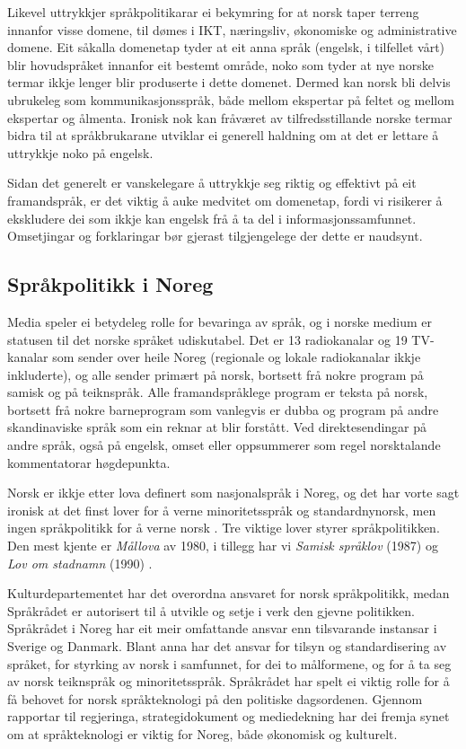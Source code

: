 \begin{multicols}{2}
Likevel uttrykkjer språkpolitikarar ei bekymring \cite{nih:2005} for at norsk taper terreng innanfor visse domene, til dømes i IKT, næringsliv, økonomiske og administrative domene. 
Eit såkalla domenetap tyder at eit anna språk (engelsk, i tilfellet vårt) blir hovudspråket innanfor eit bestemt område, noko som tyder at nye norske termar ikkje lenger blir produserte i dette domenet. 
Dermed kan norsk bli delvis ubrukeleg som kommunikasjonsspråk, både mellom ekspertar på feltet og mellom ekspertar og ålmenta. Ironisk nok kan fråværet av tilfredsstillande norske termar bidra til at språkbrukarane utviklar ei generell haldning om at det er lettare å uttrykkje noko på engelsk. 

Sidan det generelt er vanskelegare å uttrykkje seg riktig og effektivt på eit framandspråk, er det viktig å auke medvitet om domenetap, fordi vi risikerer å ekskludere dei som ikkje kan engelsk frå å ta del i informasjonssamfunnet. 
Omsetjingar og forklaringar bør gjerast tilgjengelege der dette er naudsynt.

\subsection{Språkpolitikk i Noreg}

Media speler ei betydeleg rolle for bevaringa av språk, og i norske medium er statusen til det norske språket udiskutabel. Det er 13 radiokanalar og 19 TV-kanalar som sender over heile Noreg (regionale og lokale radiokanalar ikkje inkluderte), og alle sender primært på norsk, bortsett frå nokre program på samisk og på teiknspråk. 
Alle framandspråklege program er teksta på norsk, bortsett frå nokre barneprogram som vanlegvis er dubba og program på andre skandinaviske språk som ein reknar at blir forstått. 
Ved direktesendingar på andre språk, også på engelsk, omset eller oppsummerer som regel norsktalande kommentatorar høgdepunkta.

Norsk er ikkje etter lova definert som nasjonalspråk i Noreg, og det har vorte sagt ironisk at det finst lover for å verne minoritetsspråk og standardnynorsk, men ingen språkpolitikk for å verne norsk \cite{nih:2005}. 
Tre viktige lover styrer språkpolitikken. Den mest kjente er \textit{Mållova} av 1980, i tillegg har vi \textit{Samisk språklov} (1987) og \textit{Lov om stadnamn} (1990) \cite{stm35:2008}.

Kulturdepartementet har det overordna ansvaret for norsk språkpolitikk, medan Språkrådet er autorisert til å utvikle og setje i verk den gjevne politikken. Språkrådet i Noreg har eit meir omfattande ansvar enn tilsvarande instansar i Sverige og Danmark. 
Blant anna har det ansvar for tilsyn og standardisering av språket, for styrking av norsk i samfunnet, for dei to målformene, og for å ta seg av norsk teiknspråk og minoritetsspråk. 
Språkrådet har spelt ei viktig rolle for å få behovet for norsk språkteknologi på den politiske dagsordenen. 
Gjennom rapportar til regjeringa, strategidokument og mediedekning har dei fremja synet om at språkteknologi er viktig for Noreg, både økonomisk og kulturelt.


\end{multicols}
